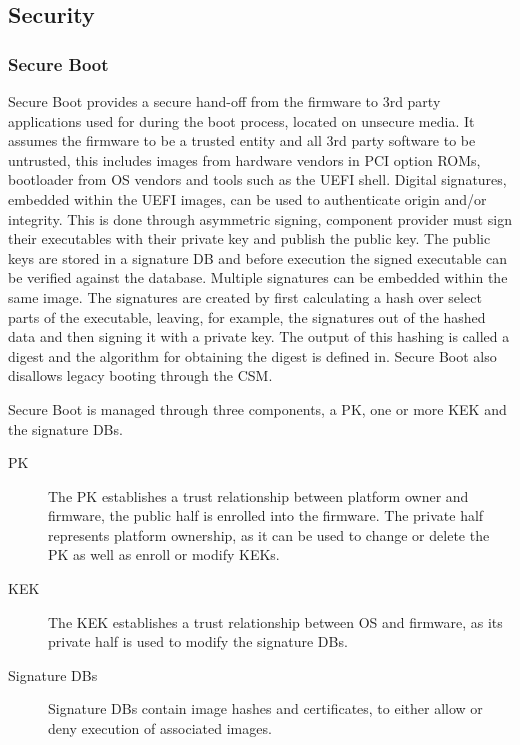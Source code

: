 
\subsection{Security}

\subsubsection{Secure Boot}

Secure Boot provides a secure hand-off from the firmware to 3rd party applications used for during the boot process, located on unsecure media\cite{tianocore-understanding-uefi-secure-boot-chain}\cite[32.2 and 32.5.1]{uefi-spec}.
It assumes the firmware to be a trusted entity and all 3rd party software to be untrusted, this includes images from hardware vendors in \ac{PCI} option \acp{ROM}, bootloader from \ac{OS} vendors and tools such as the \ac{UEFI} shell\cite{tianocore-understanding-uefi-secure-boot-chain}.
Digital signatures, embedded within the \ac{UEFI} images, can be used to authenticate origin and/or integrity\cite[32.2]{uefi-spec}.
This is done through asymmetric signing, component provider must sign their executables with their private key and publish the public key.
The public keys are stored in a signature \ac{DB} and before execution the signed executable can be verified against the database.
Multiple signatures can be embedded within the same image\cite[32.2.2]{uefi-spec}.
The signatures are created by first calculating a hash over select parts of the executable, leaving, for example, the signatures out of the hashed data and then signing it with a private key.
The output of this hashing is called a digest and the algorithm for obtaining the digest is defined in\cite{microsoft-pe-signature-format}.
Secure Boot also disallows legacy booting through the \ac{CSM}.

Secure Boot is managed through three components, a \ac{PK}, one or more \ac{KEK} and the signature \acp{DB}.

\begin{description}
    \item[\ac{PK}]
        The \ac{PK} establishes a trust relationship between platform owner and firmware, the public half is enrolled into the firmware.
        The private half represents platform ownership, as it can be used to change or delete the \ac{PK} as well as enroll or modify \acp{KEK}.
    \item[\ac{KEK}]
        The \ac{KEK} establishes a trust relationship between \ac{OS} and firmware, as its private half is used to modify the signature \acp{DB}.
    \item[Signature \acfp{DB}]
        Signature \acp{DB} contain image hashes and certificates, to either allow or deny execution of associated images.
\end{description}

